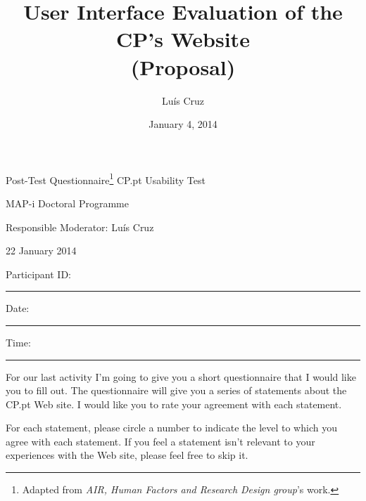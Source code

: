 \documentclass[a4paper]{article}
\title{User Interface Evaluation of the CP's Website\\ (Proposal)}
\author[1]{Luís  Cruz}
\affil[1]{MAP-i\\ Joint Doctoral Programme in Computer Science}
\date{January 4, 2014}
\newcommand{\myrule}[1]{\rule{#1}{0.45pt}}
\begin{document}
{\Large
Post-Test Questionnaire\footnote{Adapted from \textit{AIR, Human Factors and Research Design group}'s work.}
}
\vfill
CP.pt Usability Test

MAP-i Doctoral Programme

Responsible Moderator: Luís Cruz

22 January 2014

\vfill

Participant ID: \myrule{2cm}

Date: \myrule{2cm}

Time: \myrule{2cm}

\vfill

For our last activity I'm going to give you a short questionnaire that I would like you to fill out. The questionnaire will give you a series of statements about the CP.pt Web site. I would like you to rate your agreement with each statement.

For each statement, please circle a number to indicate the level to which you agree with each statement. If you feel a statement isn't relevant to your experiences with the Web site, please feel free to skip it.

\vfill
\end{document}

